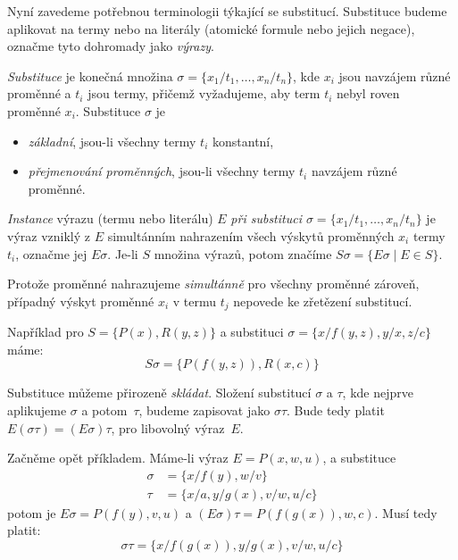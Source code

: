 Nyní zavedeme potřebnou terminologii týkající se substitucí. Substituce budeme aplikovat na termy nebo na literály (atomické formule nebo jejich negace), označme tyto dohromady jako \emph{výrazy}. 

\begin{definition}[Substituce]
    \emph{Substituce} je konečná množina $\sigma=\{x_1/t_1,\dots,x_n/t_n\}$, kde $x_i$ jsou navzájem různé proměnné a $t_i$ jsou termy, přičemž vyžadujeme, aby term $t_i$ nebyl roven proměnné $x_i$. Substituce $\sigma$ je 
    \begin{itemize}
        \item \emph{základní}, jsou-li všechny termy $t_i$ konstantní,
        \item \emph{přejmenování proměnných}, jsou-li všechny termy $t_i$ navzájem různé proměnné.
    \end{itemize}
    \emph{Instance} výrazu (termu nebo literálu) $E$ \emph{při substituci $\sigma=\{x_1/t_1,\dots,x_n/t_n\}$} je výraz vzniklý z $E$ simultánním nahrazením všech výskytů proměnných $x_i$ termy $t_i$, označme jej $E\sigma$. Je-li $S$ množina výrazů, potom značíme $S\sigma=\{E\sigma\mid E\in S\}$.
\end{definition}

Protože proměnné nahrazujeme \emph{simultánně} pro všechny proměnné zároveň, případný výskyt proměnné $x_i$ v termu $t_j$ nepovede ke zřetězení substitucí.

\begin{example}
Například pro $S=\{P(x),R(y,z)\}$ a substituci $\sigma=\{x/f(y,z),y/x,z/c\}$ máme:
$$
S\sigma=\{P(f(y,z)),R(x,c)\}
$$
\end{example}

Substituce můžeme přirozeně \emph{skládat}. Složení substitucí $\sigma$ a $\tau$, kde nejprve aplikujeme $\sigma$ a potom~$\tau$, budeme zapisovat jako $\sigma\tau$. Bude tedy platit $E(\sigma\tau)=(E\sigma)\tau$, pro libovolný výraz~$E$.

\begin{example}\label{example:compose-substitutions}
    Začněme opět příkladem. Máme-li výraz $E=P(x,w,u)$, a substituce \begin{align*}
        \sigma&=\{x/f(y),w/v\}\\
        \tau&=\{x/a,y/g(x),v/w,u/c\}
    \end{align*}
    potom je $E\sigma=P(f(y),v,u)$ a $(E\sigma)\tau=P(f(g(x)),w,c)$.
    Musí tedy platit: 
    $$
    \sigma\tau=\{x/f(g(x)),y/g(x),v/w,u/c\}
    $$
\end{example}

